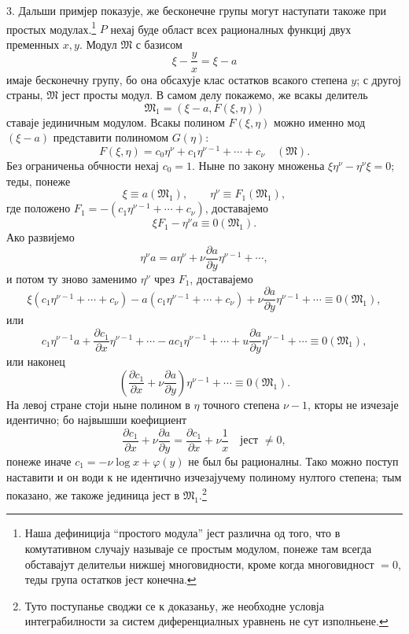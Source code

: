﻿\documentclass[11pt]{article}
\begin{document}
3. Дальши примјер показује, же бесконечне групы могут наступати такоже при простых модулах.\footnote{Наша дефиниција ``простого модула'' јест различна од того, что в комутативном случају называје се простым модулом, понеже там всегда обставајут делительи нижшеј многовидности, кроме когда многовидност \(=0\), теды група остатков јест конечна.} \(P\) нехај буде област всех рационалных функциј двух пременных \(x,y\). Модул \(\mathfrak M\) с базисом
\[
 \xi-\frac{y}{x}=\xi-a
\]
имаје бесконечну групу, бо она обсахује клас остатков всакого степена \(y\); с другој страны, \(\mathfrak M\) јест просты модул. В самом делу покажемо, же всакы делитель
\[
 \mathfrak M_1=(\xi-a,
F(\xi,\eta))
\]
ставаје јединичным модулом. Всакы полином \(F(\xi,\eta)\) можно именно мод\((\xi-a)\) представити полиномом \(G(\eta)\):
\[
 F(\xi,\eta)=c_0\eta^\nu+c_1\eta^{\nu-1}+\cdots+c_\nu\quad(\mathfrak M).
\]
Без ограниченьа обчности нехај \(c_0=1\). Ныне по закону множеньа \(\xi\eta^\nu-\eta^\nu\xi=0\); теды, понеже
\[
 \xi\equiv a(\mathfrak M_1),
 \qquad
 \eta^\nu\equiv F_1(\mathfrak M_1),
\]
где положено \(F_1=-(c_1\eta^{\nu-1}+\cdots+c_\nu)\), доставајемо
\[
 \xi F_1-\eta^\nu a\equiv0(\mathfrak M_1).
\]
Ако развијемо
\[
 \eta^\nu a=a\eta^\nu+\nu\frac{\partial a}{\partial y}\eta^{\nu-1}+\cdots,
\]
и потом ту зново заменимо \(\eta^\nu\) чрез \(F_1\), доставајемо
\[
 \xi(c_1\eta^{\nu-1}+\cdots+c_\nu)-a(c_1\eta^{\nu-1}+\cdots+c_\nu)
 +\nu\frac{\partial a}{\partial y}\eta^{\nu-1}+\cdots\equiv0(\mathfrak M_1),
\]
или
\[
 c_1\eta^{\nu-1}a+\frac{\partial c_1}{\partial x}\eta^{\nu-1}+\cdots
 -ac_1\eta^{\nu-1}+\cdots+
u\frac{\partial a}{\partial y}\eta^{\nu-1}+\cdots
 \equiv0(\mathfrak M_1),
\]
или наконец
\[
 \left(\frac{\partial c_1}{\partial x}+\nu\frac{\partial a}{\partial y}\right)\eta^{\nu-1}+\cdots
 \equiv0(\mathfrak M_1).
\]
На левој стране стоји ныне полином в \(\eta\) точного степена \(\nu-1\), кторы не изчезаје идентично; бо највышши коефициент
\[
 \frac{\partial c_1}{\partial x}+\nu\frac{\partial a}{\partial y}
 =\frac{\partial c_1}{\partial x}+\nu\frac{1}{x}
 \quad\text{јест }\ne0,
\]
понеже иначе \(c_1=-\nu\log x+\varphi(y)\) не был бы рационалны. Тако можно поступ наставити и он води к не идентично изчезајучему полиному нултого степена; тым показано, же такоже јединица јест в \(\mathfrak M_1\).\footnote{Туто поступанье своджи се к доказаньу, же необходне условја интеграбилности за систем диференциалных уравнень не сут изполньене.}
\end{document}
